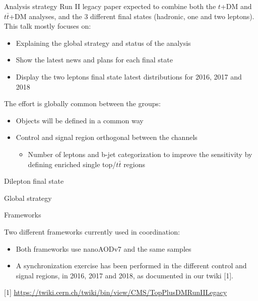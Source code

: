 \documentclass[8pt]{beamer}
\begin{document}
\begin{frame}{Analysis strategy}
\justifying
Run II legacy paper expected to \alert{combine both the $t$+DM and $t \bar t$+DM analyses}, and the 3 different final states (hadronic, one and two leptons). \vfill
This talk mostly focuses on:
\begin{itemize}
\justifying
\item Explaining the global strategy and status of the analysis 
\item Show the latest news and plans for each final state 
\item Display the two leptons final state latest distributions for 2016, 2017 and 2018
\end{itemize} \vfill
The effort is \alert{globally common} between the groups:
\begin{itemize}
\item Objects will be defined in a common way
\item Control and signal region orthogonal between the channels
\begin{itemize}
\item Number of leptons and b-jet categorization to improve the sensitivity by defining enriched single top/$t \bar t$ regions
\end{itemize}
\end{itemize}
\end{frame}

\begin{frame}[standout]
Dilepton final state
\end{frame}

\begin{frame}{Global strategy}
%

\begin{block}{\centering Frameworks}\end{block}
\alert{Two different frameworks} currently used in coordination:
\begin{itemize}
\justifying
\item Both frameworks use nanoAODv7 and the same samples
\item A synchronization exercise has been performed in the different control and signal regions, in 2016, 2017 and 2018, as documented in our twiki [1].
\end{itemize}
[1] \url{https://twiki.cern.ch/twiki/bin/view/CMS/TopPlusDMRunIILegacy} \vfill
\end{frame}
\end{document}
